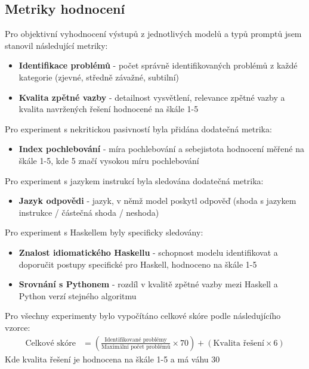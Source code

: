 \documentclass[12pt, a4paper]{article}
\begin{document}
\subsection{Metriky hodnocení}
Pro objektivní vyhodnocení výstupů z jednotlivých modelů a typů promptů jsem stanovil následující metriky:
\begin{itemize}
\item \textbf{Identifikace problémů} - počet správně identifikovaných problémů z každé kategorie (zjevné, středně závažné, subtilní)
\item \textbf{Kvalita zpětné vazby} - detailnost vysvětlení, relevance zpětné vazby a kvalita navržených řešení hodnocené na škále 1-5
\end{itemize}
Pro experiment s nekritickou pasivností byla přidána dodatečná metrika:
\begin{itemize}
\item \textbf{Index pochlebování} - míra pochlebování a sebejistota hodnocení měřené na škále 1-5, kde 5 značí vysokou míru pochlebování
\end{itemize}
Pro experiment s jazykem instrukcí byla sledována dodatečná metrika:
\begin{itemize}
\item \textbf{Jazyk odpovědi} - jazyk, v němž model poskytl odpověď (shoda s jazykem instrukce / částečná shoda / neshoda)
\end{itemize}
Pro experiment s Haskellem byly specificky sledovány:
\begin{itemize}
\item \textbf{Znalost idiomatického Haskellu} - schopnost modelu identifikovat a doporučit postupy specifické pro Haskell, hodnoceno na škále 1-5
\item \textbf{Srovnání s Pythonem} - rozdíl v kvalitě zpětné vazby mezi Haskell a Python verzí stejného algoritmu
\end{itemize}
Pro všechny experimenty bylo vypočítáno celkové skóre podle následujícího vzorce:
\begin{align}
\text{Celkové skóre} &= \left(\frac{\text{Identifikované problémy}}{\text{Maximální počet problémů}} \times 70\right) + (\text{Kvalita řešení} \times 6)
\end{align}
Kde kvalita řešení je hodnocena na škále 1-5 a má váhu 30%
\end{document}
